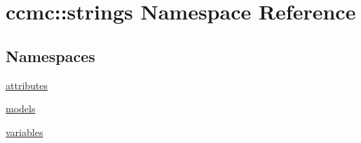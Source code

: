 \hypertarget{namespaceccmc_1_1strings}{\section{ccmc\-:\-:strings Namespace Reference}
\label{namespaceccmc_1_1strings}
}
\subsection*{Namespaces}
\begin{DoxyCompactItemize}
\item 
\hyperlink{namespaceccmc_1_1strings_1_1attributes}{attributes}
\item 
\hyperlink{namespaceccmc_1_1strings_1_1models}{models}
\item 
\hyperlink{namespaceccmc_1_1strings_1_1variables}{variables}
\end{DoxyCompactItemize}
